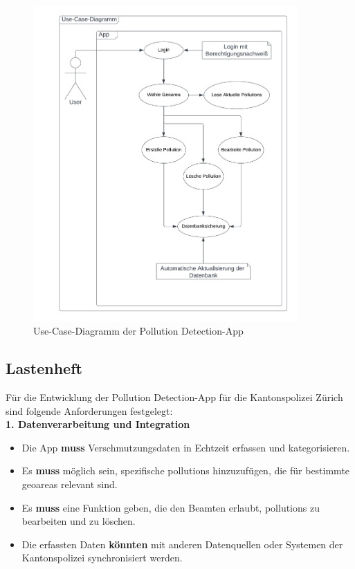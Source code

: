 \documentclass[a4paper,12pt]{article}
\begin{document}
\begin{figure}[h]
\centering
\includegraphics[width=0.9\textwidth]{bilder/use-case-diagramm.drawio.png}
\caption{Use-Case-Diagramm der \glqq Pollution Detection\grqq{}-App}
\end{figure}

\clearpage
\subsection{Lastenheft}
\label{sec:lastenheft}

Für die Entwicklung der \glqq Pollution Detection\grqq{}-App für die Kantonspolizei Zürich sind folgende Anforderungen festgelegt:\\

\noindent\textbf{1. Datenverarbeitung und Integration}

\begin{itemize}
    \item Die App \textbf{muss} Verschmutzungsdaten in Echtzeit erfassen und kategorisieren.
    \item Es \textbf{muss} möglich sein, spezifische \glspl{pollution} hinzuzufügen, die für bestimmte \glspl{geoarea} relevant sind.
    \item Es \textbf{muss} eine Funktion geben, die den Beamten erlaubt, \glspl{pollution} zu bearbeiten und zu löschen.
    \item Die erfassten Daten \textbf{könnten} mit anderen Datenquellen oder Systemen der Kantonspolizei synchronisiert werden.
\end{itemize}
\end{document}
